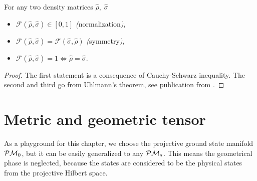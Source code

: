 \begin{thm}
    For any two density matrices $\hat\rho,\;\hat\sigma$
    \begin{itemize}
        \item $\mathcal F(\hat\rho,\hat\sigma)\in[0,1]$ \emph(normalization\emph),
        \item $\mathcal F(\hat\rho,\hat\sigma) = \mathcal F(\hat\sigma,\hat\rho)$ \emph(symmetry\emph),
        \item $\mathcal F(\hat\rho,\hat\sigma)=1 \Leftrightarrow \hat\rho=\hat\sigma$.
    \end{itemize}
\end{thm}
\begin{proof}
    The first statement is a consequence of Cauchy-Schwarz inequality. The second and third go from Uhlmann's theorem, see publication from \citet{uhlman}.
\end{proof}



\section{Metric and geometric tensor}
\label{chap:metricTensor}
As a playground for this chapter, we choose the projective ground state manifold $\mathcal{P}\mathcal{M}_0$, but it can be easily generalized to any $\mathcal{P}\mathcal{M}_s$. This means the geometrical phase is neglected, because the states are considered to be the physical states from the projective Hilbert space.

